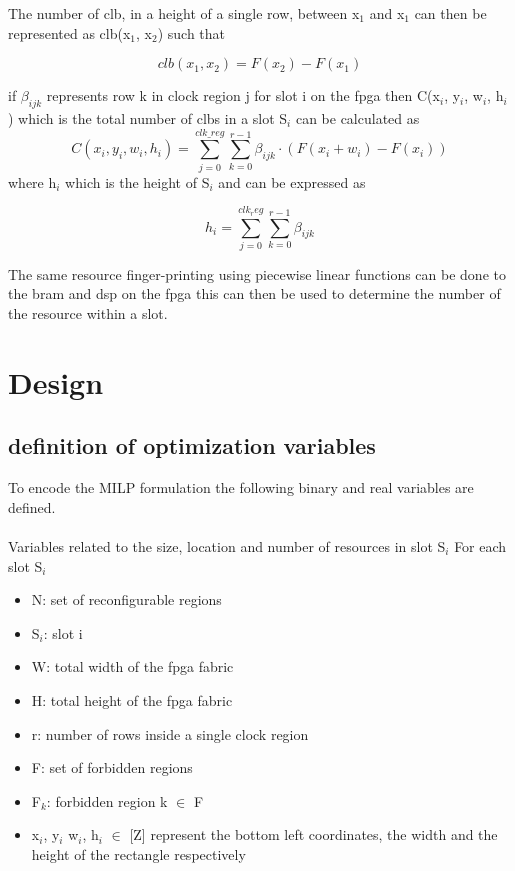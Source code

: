 \documentclass[conference]{IEEEtran}
\begin{document}
The number of clb, in a height of a single row, between x$_1$ and x$_1$ can then be represented as clb(x$_1$, x$_2$) such that 

\begin{equation}
clb(x_1, x_2) = F(x_2) - F(x_1)
\end{equation}

if $\beta_{ijk}$ represents row k in clock region j for slot i on the fpga then C(x$_i$, y$_i$, w$_i$, h$_i$) which is the total number of clbs in a slot S$_i$ can be calculated as 
\begin{equation}
C(x_i,y_i,w_i,h_i) = \sum_{j=0}^{clk\_reg} \sum_{k=0}^{r-1} \beta_{ijk} \cdot (F(x_i+w_i) - F(x_i))
\label{clb_tot}
\end{equation}
where h$_i$ which is the height of S$_i$ and can be expressed as 

\begin{equation}
h_i = \sum_{j=0} ^{clk_reg} \sum_{k=0}^{r-1} \beta_{ijk}
\end{equation}

The same resource finger-printing using piecewise linear functions can be done to the bram and dsp on the fpga this can then be used to determine the number of the resource within a slot.


\section{Design}
\subsection{definition of optimization variables}
To encode the MILP formulation the following binary and real variables are defined. \\ \\
Variables related to the size, location and number of resources in slot S$_i$ 
For each slot S$_i$
\begin{itemize}
\item N: set of reconfigurable regions

\item S$_i$: slot i

\item W: total width of the fpga fabric

\item H: total height of the fpga fabric

\item r: number of rows inside a single clock region

\item F: set of forbidden regions

\item F$_k$: forbidden region k $\in$ F

\item x$_i$, y$_i$ w$_i$, h$_i$ $\in$ [Z] represent the bottom left coordinates, the width and the height of the rectangle respectively
\end{itemize}
\end{document}
